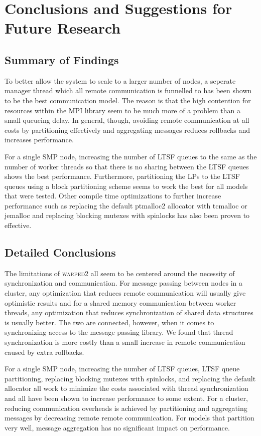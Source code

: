 \documentclass[11pt]{book}
\begin{document}
\chapter[Conclusions \& Future Research]{Conclusions and Suggestions for Future Research}
\label{conclude}

\section{Summary of Findings}

To better allow the system to scale to a larger number of nodes, a seperate manager thread which all
remote communication is funnelled to has been shown to be the best communication model.  The
reason is that the high contention for resources within the MPI library seem to be much more
of a problem than a small queueing delay.  In general, though, avoiding remote communication at
all costs by partitioning effectively and aggregating messages reduces rollbacks and increases
performance.  

For a single SMP node, increasing the number of LTSF queues to the same as the number of worker
threads so that there is no sharing between the LTSF queues shows the best performance.  Furthermore,
partitioning the LPs to the LTSF queues using a block partitioning scheme seems to work the best
for all models that were tested.  Other compile time optimizations to further increase performance
such as replacing the default ptmalloc2 allocator with tcmalloc or jemalloc and replacing blocking
mutexes with spinlocks has also been proven to effective.

\section{Detailed Conclusions}

The limitations of \textsc{warped2} all seem to be centered around the necessity of synchronization
and communication.  For message passing between nodes in a cluster, any optimization
that reduces remote communication will usually give optimistic results and for a shared memory
communication between worker threads, any optimization that reduces synchronization of shared
data structures is usually better.  The two are connected, however, when it comes to synchronizing
access to the message passing library.  We found that thread synchronization is more costly than
a small increase in remote communication caused by extra rollbacks.

For a single SMP node, increasing the number of LTSF queues, LTSF queue partitioning,
replacing blocking mutexes with spinlocks, and replacing the default allocator all work to
minimize the costs associated with thread synchronization and all have been shown to increase
performance to some extent.  For a cluster, reducing communication overheads is achieved by
partitioning and aggregating messages by decreasing remote remote communication.  For models that
partition very well, message aggregation has no significant impact on performance.
\end{document}
